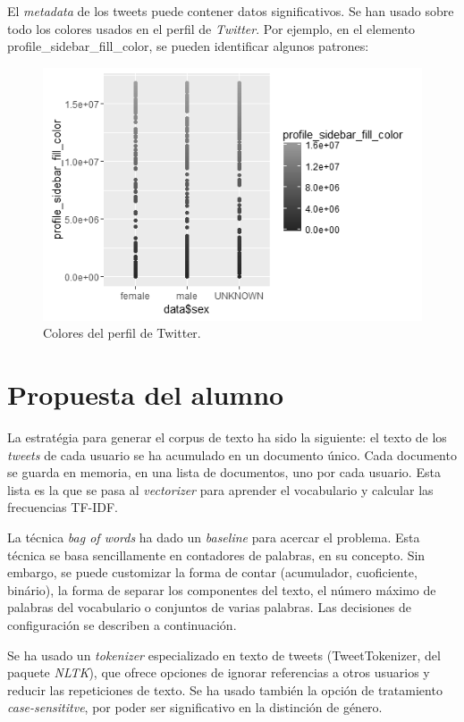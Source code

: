 \documentclass[11pt,a4paper]{article}
\begin{document}
  El {\em metadata} de los tweets puede contener datos significativos. Se han usado sobre todo los colores usados en el perfil de {\em Twitter}. Por ejemplo, en el elemento {\ttfamily profile\_sidebar\_fill\_color}, se pueden identificar algunos patrones:
   
  \begin{figure}[ht!]
    \includegraphics[width=\linewidth]{profile_colors.png}
    \caption{Colores del perfil de Twitter.}
    \label{fig:profile_colors}
  \end{figure}
  

\section{Propuesta del alumno}

  La estrat\'egia para generar el corpus de texto ha sido la siguiente: el texto de los {\em tweets} de cada usuario se ha acumulado en un documento \'unico. Cada documento se guarda en memoria, en una lista de documentos, uno por cada usuario. Esta lista es la que se pasa al {\em vectorizer} para aprender el vocabulario y calcular las frecuencias TF-IDF.

  La t\'ecnica {\em bag of words} ha dado un {\em baseline} para acercar el problema. Esta t\'ecnica se basa sencillamente en contadores de palabras, en su concepto. Sin embargo, se puede customizar la forma de contar (acumulador, cuoficiente, bin\'ario), la forma de separar los componentes del texto, el n\'umero m\'aximo de palabras del vocabulario o conjuntos de varias palabras. Las decisiones de configuraci\'on se describen a continuaci\'on.

  Se ha usado un {\em tokenizer} especializado en texto de tweets ({\ttfamily TweetTokenizer}, del paquete {\em NLTK}), que ofrece opciones de ignorar referencias a otros usuarios y reducir las repeticiones de texto. Se ha usado tambi\'en la opci\'on de tratamiento {\em case-sensititve}, por poder ser significativo en la distinci\'on de g\'enero.
\end{document}
